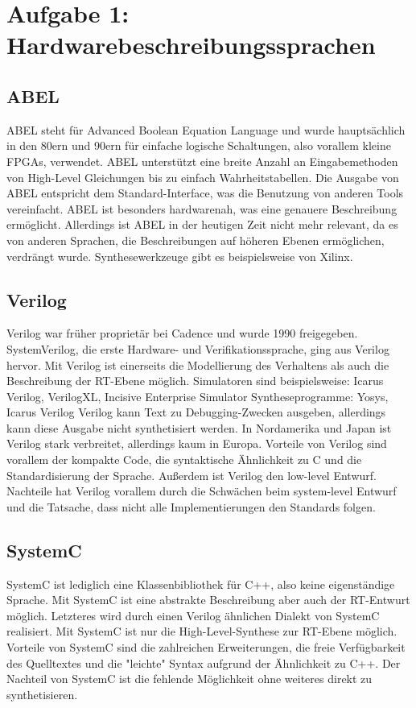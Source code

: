 \documentclass[parskip=full]{scrartcl}
\begin{document}
	\section*{Aufgabe 1: Hardwarebeschreibungssprachen}
		\subsection{ABEL}
			ABEL steht für Advanced Boolean Equation Language und wurde hauptsächlich in den 80ern und 90ern für einfache logische Schaltungen, also vorallem kleine FPGAs, verwendet. ABEL unterstützt eine breite Anzahl an Eingabemethoden von High-Level Gleichungen bis zu einfach Wahrheitstabellen. 
			Die Ausgabe von ABEL entspricht dem Standard-Interface, was die Benutzung von anderen Tools vereinfacht. ABEL ist besonders hardwarenah, was eine genauere Beschreibung ermöglicht.
			Allerdings ist ABEL in der heutigen Zeit nicht mehr relevant, da es von anderen Sprachen, die Beschreibungen auf höheren Ebenen ermöglichen, verdrängt wurde.
			Synthesewerkzeuge gibt es beispielsweise von Xilinx.
			
		\subsection{Verilog}
			Verilog war früher proprietär bei Cadence und wurde 1990 freigegeben. SystemVerilog, die erste Hardware- und Verifikationssprache, ging aus Verilog hervor. Mit Verilog ist einerseits die Modellierung des Verhaltens als auch die Beschreibung der RT-Ebene möglich.
			Simulatoren sind beispielsweise: Icarus Verilog, VerilogXL, Incisive Enterprise Simulator
			Syntheseprogramme: Yosys, Icarus Verilog
			Verilog kann Text zu Debugging-Zwecken ausgeben, allerdings kann diese Ausgabe nicht synthetisiert werden. In Nordamerika und Japan ist Verilog stark verbreitet, allerdings kaum in Europa.
			Vorteile von Verilog sind vorallem der kompakte Code, die syntaktische Ähnlichkeit zu C und die Standardisierung der Sprache. Außerdem ist Verilog den low-level Entwurf.
			Nachteile hat Verilog vorallem durch die Schwächen beim system-level Entwurf und die Tatsache, dass nicht alle Implementierungen den Standards folgen.
		
		\subsection{SystemC}
			SystemC ist lediglich eine Klassenbibliothek für C++, also keine eigenständige Sprache. Mit SystemC ist eine abstrakte Beschreibung aber auch der RT-Entwurt möglich. Letzteres wird durch einen Verilog ähnlichen Dialekt von SystemC realisiert. Mit SystemC ist nur die High-Level-Synthese zur RT-Ebene möglich.
			Vorteile von SystemC sind die zahlreichen Erweiterungen, die freie Verfügbarkeit des Quelltextes und die "leichte" Syntax aufgrund der Ähnlichkeit zu C++.
			Der Nachteil von SystemC ist die fehlende Möglichkeit ohne weiteres direkt zu synthetisieren.
		
\end{document}
